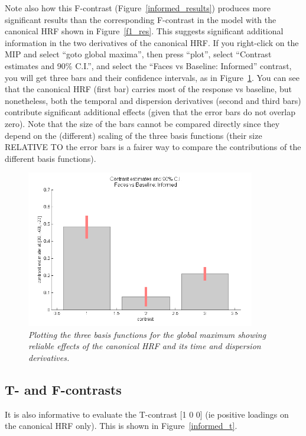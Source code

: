 Note also how this F-contrast (Figure~\ref{informed_results}) produces more significant results than the corresponding F-contrast in the model with the canonical HRF shown in Figure~\ref{f1_res}. This suggests significant additional information in the two derivatives of the canonical HRF. If you right-click on the MIP and select ``goto global maxima'', then press ``plot'', select ``Contrast estimates and 90\% C.I.'', and select the ``Faces vs Baseline: Informed'' contrast, you will get three bars and their confidence intervals, as in Figure~\ref{informed_plot}. You can see that the canonical HRF (first bar) carries most of the response vs baseline, but nonetheless, both the temporal and dispersion derivatives (second and third bars) contribute significant additional effects (given that the error bars do not overlap zero). Note that the size of the bars cannot be compared directly since they depend on the (different) scaling of the three basis functions (their size RELATIVE TO the error bars is a fairer way to compare the contributions of the different basis functions).

\begin{figure}
\begin{center}
\includegraphics[width=100mm]{faces_group/informed_plot}
\caption{\em Plotting the three basis functions for the global maximum showing reliable effects of the canonical HRF and its time and dispersion derivatives. \label{informed_plot}}
\end{center}
\end{figure}

\subsection{T- and F-contrasts}

It is also informative to evaluate the T-contrast [1 0 0] (ie positive loadings on the canonical HRF only). This is shown in Figure~\ref{informed_t}.

